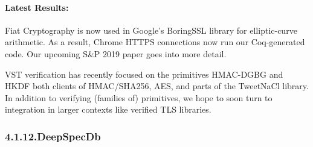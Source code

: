 \documentclass[12pt,twoside]{article}
\begin{document}
\paragraph{Latest Results:}\label{sec-latest-results-}%

\noindent{}Fiat Cryptography is now used in Google's BoringSSL library for
elliptic-curve arithmetic.  As a result, Chrome HTTPS connections now
run our Coq-generated code.  Our  upcoming S\&P 2019 paper goes into
more detail.%

VST verification has recently focused on the primitives HMAC-DGBG and
HKDF \textendash{} both clients of HMAC/SHA256, AES, and parts of the TweetNaCl
library. In addition to verifying (families of) primitives, we hope to
soon turn to integration in larger contexts like verified TLS
libraries.%

\subsubsection{4.1.12.\hspace*{0.5em}DeepSpecDb}\label{sec-deepspecdb}%
\end{document}
